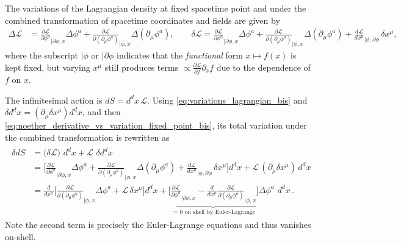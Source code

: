 \documentclass[../QFT_main.tex]{subfiles}
\begin{document}
\begin{mytheorem}
The variations of the Lagrangian density at fixed spacetime point and under the combined transformation of spacetime coordinates and fields are given by
{\small\begin{align}\label{eq:variations_lagrangian_bis}
    \Delta\mathcal L
    &= \tfrac{\partial\mathcal{L}}{\partial \phi^a}_{|\partial\phi, x} \Delta \phi^a + \tfrac{\partial\mathcal{L}}{\partial (\partial_\mu \phi^a)}_{|\phi,x} \Delta (\partial_\mu\phi^a),
    \qquad
    \delta \mathcal{L} = \tfrac{\partial\mathcal{L}}{\partial \phi^a}_{|\partial\phi, x} \Delta \phi^a + \tfrac{\partial\mathcal{L}}{\partial (\partial_\mu \phi^a)}_{|\phi,x} \Delta (\partial_\mu\phi^a)
    +\tfrac{d\mathcal{L}}{dx^\mu}_{|\phi,\partial\phi}\, \delta x^\mu,
\end{align}}
where the subscript $|\phi$ or $|\partial\phi$ indicates that the \emph{functional} form $x\mapsto f(x)$ is kept fixed, but varying $x^\mu$ still produces terms $\propto \tfrac{\partial \mathcal{L}}{\partial f}\partial_\nu f$ due to the dependence of $f$ on $x$. 

The infinitesimal action is $d S= d^d\!x\, \mathcal{L}$.
Using \eqref{eq:variations_lagrangian_bis} and $\delta d^d\! x = (\partial_\mu \delta x^\mu) d^d\! x$, and then \eqref{eq:noether_derivative_vs_variation_fixed_point_bis}, its total variation under the combined transformation is rewritten as
{\small\begin{align}
\begin{aligned}
    \delta dS &= \big(\delta \mathcal{L}\big) \,\,d^d\!x + \mathcal{L}\, \, \delta d^d\!x 
    \\
    &= \bigg[\tfrac{\partial\mathcal{L}}{\partial \phi^a}_{|\partial\phi, x} \Delta \phi^a + \tfrac{\partial\mathcal{L}}{\partial (\partial_\mu \phi^a)}_{|\phi,x} \Delta (\partial_\mu\phi^a)
    +\tfrac{d\mathcal{L}}{dx^\mu}_{|\phi,\partial\phi}\, \delta x^\mu\bigg] d^d\!x + \mathcal{L} \, (\partial_\mu \delta x^\mu)\, d^d\!x
    \\
    &= \tfrac{d}{dx^\mu}\bigg[\tfrac{\partial\mathcal{L}}{\partial (\partial_\mu \phi^a)}_{|\phi,x}\Delta\phi^a+ \mathcal{L} \,\delta x^\mu\bigg] d^d\!x
    + \bigg[\underbrace{\tfrac{\partial\mathcal{L}}{\partial \phi^a}_{|\partial\phi, x}-\tfrac{d}{dx^\mu}\tfrac{\partial\mathcal{L}}{\partial (\partial_\mu \phi^a)}_{|\phi,x}}_{=0\,\, \text{on shell by Euler-Lagrange}} \bigg] \Delta\phi^a\,\, d^d\!x\,.
\end{aligned}
\end{align}}
Note the second term is precisely the Euler-Lagrange equations and thus vanishes on-shell.


\end{mytheorem}
\end{document}
